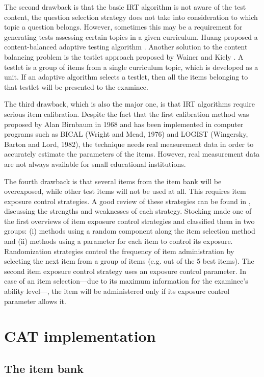 \documentclass[11pt,twoside]{article}
\begin{document}
The second drawback is that the basic IRT algorithm is not aware of the test content, the question selection strategy does not take into consideration to which topic a question belongs. However, sometimes this may be a requirement for generating tests assessing certain topics in a given curriculum. Huang proposed a content-balanced adaptive testing algorithm \cite{HUANG}. Another solution to the content balancing problem is the testlet approach proposed by Wainer and Kiely \cite{WAINER}.  A testlet is a group of items from a single curriculum topic, which is developed as a unit. If an adaptive algorithm selects a testlet, then all the items belonging to that testlet will be presented to the examinee.

The third drawback, which is also the major one, is that IRT algorithms require serious item calibration. Despite the fact that the first calibration method was proposed by Alan Birnbaum in 1968 and has been implemented in computer programs such as BICAL (Wright and Mead, 1976) and LOGIST (Wingersky, Barton and Lord, 1982), the technique needs real measurement data in order to accurately estimate the parameters of the items. However, real measurement data are not always available for small educational institutions.


The fourth drawback is that several items from the item bank will be overexposed, while other test items will not be used at all. This requires item exposure control strategies.  A good review of these strategies can be found in \cite{GEORGIADOU}, discussing the strengths and weaknesses of each strategy. Stocking \cite{STOCKING} made one of the first overviews of item exposure control strategies and classified them in two groups: (i) methods using a random component along the item selection method and (ii) methods using a parameter for each item to control its exposure.  Randomization strategies control the frequency of item administration by selecting the next item from a group of items (e.g. out of the 5 best items). The second item exposure control strategy uses an exposure control parameter. In case of an item selection---due to its maximum information for the examinee's ability level---, the item will be administered only if its exposure control parameter  allows it.


\section{CAT implementation}


\subsection{The item bank}
\end{document}
